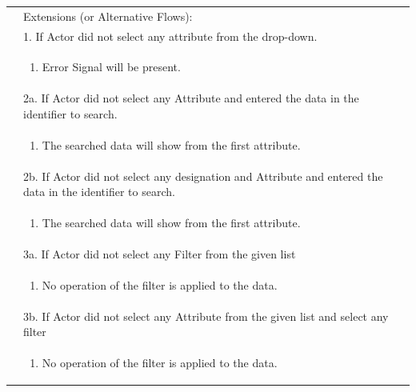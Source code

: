 \documentclass[12pt,a4paper]{article}
\begin{document}
\begin{longtable}{| p{3cm}|p{12cm}|}
&Extensions (or Alternative Flows):\\

& 1. If Actor did not select any attribute from the drop-down. \\
& \begin{enumerate}
		\item Error Signal will be present.
	\end{enumerate}
\\ 

& 2a. If Actor did not select any Attribute and entered the data in the identifier to search. \\
& \begin{enumerate}
		\item The searched data will show from the first attribute.
	\end{enumerate}
\\ 
& 2b. If Actor did not select any designation and  Attribute and entered the data in the identifier to search. \\
& \begin{enumerate}
		\item The searched data will show from the first attribute.
	\end{enumerate}
	\\
& 3a. If Actor did not select any Filter from the given list \\
& \begin{enumerate}
		\item No operation of the filter is applied to the data.
	\end{enumerate}
\\ 
& 3b. If Actor did not select any Attribute from the given list and select any filter  \\
& \begin{enumerate}
		\item No operation of the filter is applied to the data.
	\end{enumerate}
\\ 


\end{longtable}
\end{document}
